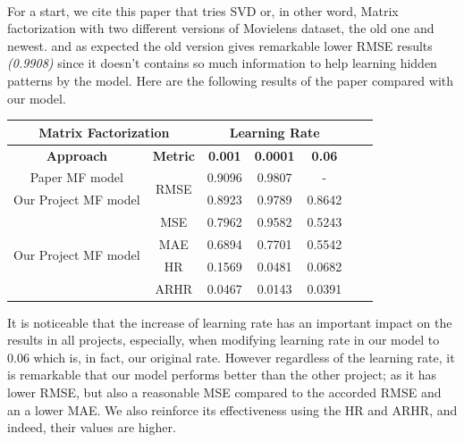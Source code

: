 \documentclass{cup-pan}
\begin{document}
\paragraph{}
For a start, we cite this paper\cite{21} that tries SVD or, in other word, Matrix factorization with two different versions of Movielens dataset, the old one and newest. and as expected the old version gives remarkable lower RMSE results \textit{(0.9908)} since it doesn't contains so much information to help learning hidden patterns by the model. Here are the following results of the paper compared with our model.
\begin{center} 
  \begin{tabular}{|c|c||c|c|c|c|c||}
    \hline\hline 
    \multicolumn{2}{|c||}{\textbf{Matrix Factorization}} & \multicolumn{3}{c|}{\textbf{Learning Rate}} \\
    \hline
    \textbf{Approach} & \textbf{Metric} & \textbf{0.001} & \textbf{0.0001} & \textbf{0.06}\\
    \hline
    Paper MF model  & \multirow{2}{*}{RMSE} & 0.9096 & 0.9807 & - \\
    Our Project MF model &  & 0.8923 & 0.9789 & 0.8642 \\
    \hline
    \hline
    \multirow{4}{*}{Our Project MF model} & MSE & 0.7962 & 0.9582 & 0.5243 \\
    & MAE & 0.6894 & 0.7701 & 0.5542 \\
    & HR & 0.1569 & 0.0481 & 0.0682 \\
    & ARHR & 0.0467 & 0.0143 & 0.0391 \\
    \hline\hline
  \end{tabular}
\end{center}


It is noticeable that the increase of learning rate has an important impact on the results in all projects, especially, when modifying learning rate in our model to 0.06 which is, in fact, our original rate. However regardless of the learning rate, it is remarkable that our model performs better than the other project; as it has lower RMSE, but also a reasonable MSE compared to the accorded RMSE and an a lower MAE. We also reinforce its effectiveness using the HR and ARHR, and indeed, their values are higher.
\end{document}
